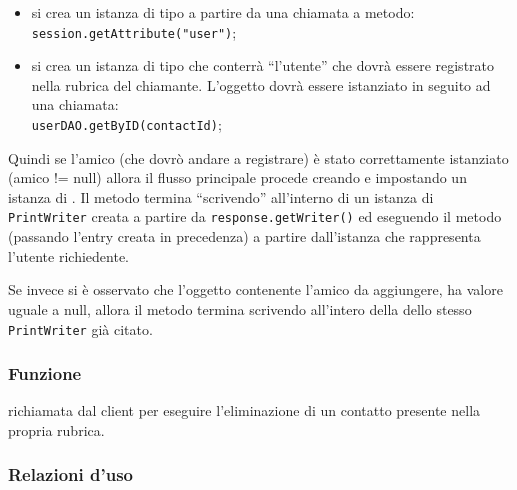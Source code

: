 \begin{description}
\begin{itemize}
		\item si crea un istanza di tipo  a partire da una chiamata a metodo:\\
		\verb|session.getAttribute("user")|;
		
		\item si crea un istanza di tipo  che conterrà ``l'utente'' che dovrà essere registrato nella rubrica del chiamante. L'oggetto dovrà essere istanziato in seguito ad una chiamata:\\
		\verb|userDAO.getByID(contactId)|;
	\end{itemize}
	Quindi se l'amico (che dovrò andare a registrare) è stato correttamente istanziato (amico != null) allora il flusso principale procede creando e impostando un istanza di . Il metodo termina ``scrivendo''  all'interno di un istanza di \texttt{PrintWriter} creata a partire da \texttt{response.getWriter()} ed eseguendo il metodo  (passando l'entry creata in precedenza) a partire dall'istanza che rappresenta l'utente richiedente.
	
	Se invece si è osservato che l'oggetto contenente l'amico da aggiungere, ha valore uguale a null, allora il metodo termina scrivendo  all'intero della dello stesso \texttt{PrintWriter} già citato.
\end{description}



\subsubsection*{Funzione}
 richiamata dal client per eseguire l'eliminazione di un contatto presente nella propria rubrica.

\subsubsection*{Relazioni d'uso}

